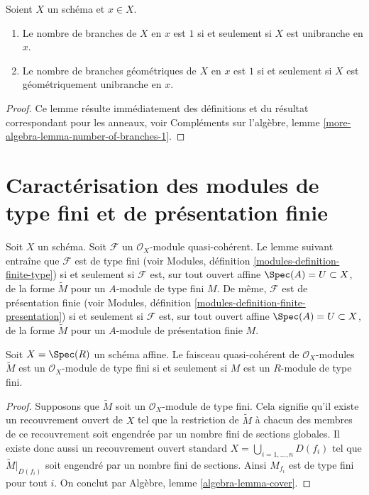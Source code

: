 \begin{lemma}
\label{lemma-number-of-branches-1}
Soient $X$ un schéma et $x \in X$.
\begin{enumerate}
\item Le nombre de branches de $X$ en $x$ est $1$ si et seulement si
$X$ est unibranche en $x$.
\item Le nombre de branches géométriques de $X$ en $x$ est $1$ si et seulement si
$X$ est géométriquement unibranche en $x$.
\end{enumerate}
\end{lemma}

\begin{proof}
Ce lemme résulte immédiatement des définitions et du résultat correspondant pour
les anneaux, voir Compléments sur l'algèbre, lemme
\ref{more-algebra-lemma-number-of-branches-1}.
\end{proof}






\section{Caractérisation des modules de type fini et de présentation finie}
\label{section-characterizing-finite-type-presentation}

\noindent
Soit $X$ un schéma.
Soit $\mathcal{F}$ un $\mathcal{O}_X$-module
quasi-cohérent. Le lemme suivant entraîne que $\mathcal{F}$ est de type fini
(voir Modules, définition \ref{modules-definition-finite-type})
si et seulement si $\mathcal{F}$ est,
sur tout ouvert affine $\Spec(A) = U \subset X$,
de la forme $\widetilde M$ pour un $A$-module de type fini $M$.
De même, $\mathcal{F}$ est de présentation finie
(voir Modules, définition \ref{modules-definition-finite-presentation})
si et seulement si $\mathcal{F}$ est,
sur tout ouvert affine $\Spec(A) = U \subset X$,
de la forme $\widetilde M$ pour un $A$-module de présentation finie $M$.

\begin{lemma}
\label{lemma-finite-type-module}
Soit $X = \Spec(R)$ un schéma affine. Le
faisceau quasi-cohérent de $\mathcal{O}_X$-modules
$\widetilde M$ est un $\mathcal{O}_X$-module de
type fini si et seulement si $M$ est un $R$-module de type fini.
\end{lemma}

\begin{proof}
Supposons que $\widetilde M$ soit un $\mathcal{O}_X$-module de
type fini. Cela signifie qu'il existe un recouvrement ouvert de $X$ tel que la restriction de
$\widetilde M$ à chacun des membres de ce recouvrement soit
engendrée par un nombre fini de sections globales.
Il existe donc aussi un recouvrement ouvert standard
$X = \bigcup_{i = 1, \ldots, n} D(f_i)$ tel que $\widetilde M|_{D(f_i)}$
soit engendré par un nombre fini de sections. Ainsi $M_{f_i}$ est de
type fini pour tout $i$. On conclut par
Algèbre, lemme \ref{algebra-lemma-cover}.
\end{proof}

